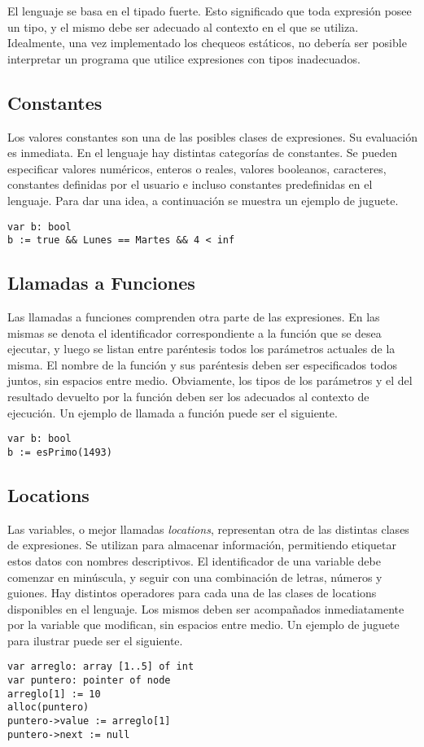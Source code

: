 \documentclass{article}
\begin{document}
El lenguaje se basa en el tipado fuerte.
Esto significado que toda expresión posee un tipo, y el mismo debe ser adecuado al contexto en el que se utiliza.
Idealmente, una vez implementado los chequeos estáticos, no debería ser posible interpretar un programa que utilice expresiones con tipos inadecuados.

\subsection{Constantes}

Los valores constantes son una de las posibles clases de expresiones.
Su evaluación es inmediata.
En el lenguaje hay distintas categorías de constantes.
Se pueden especificar valores numéricos, enteros o reales, valores booleanos, caracteres, constantes definidas por el usuario e incluso constantes predefinidas en el lenguaje.
Para dar una idea, a continuación se muestra un ejemplo de juguete.
\begin{lstlisting}
var b: bool
b := true && Lunes == Martes && 4 < inf
\end{lstlisting}

\subsection{Llamadas a Funciones}

Las llamadas a funciones comprenden otra parte de las expresiones.
En las mismas se denota el identificador correspondiente a la función que se desea ejecutar, y luego se listan entre paréntesis todos los parámetros actuales de la misma.
El nombre de la función y sus paréntesis deben ser especificados todos juntos, sin espacios entre medio.
Obviamente, los tipos de los parámetros y el del resultado devuelto por la función deben ser los adecuados al contexto de ejecución.
Un ejemplo de llamada a función puede ser el siguiente.
\begin{lstlisting}
var b: bool
b := esPrimo(1493)
\end{lstlisting}

\subsection{Locations}

Las variables, o mejor llamadas \textit{locations}, representan otra de las distintas clases de expresiones.
Se utilizan para almacenar información, permitiendo etiquetar estos datos con nombres descriptivos.
El identificador de una variable debe comenzar en minúscula, y seguir con una combinación de letras, números y guiones.
Hay distintos operadores para cada una de las clases de locations disponibles en el lenguaje.
Los mismos deben ser acompañados inmediatamente por la variable que modifican, sin espacios entre medio.
Un ejemplo de juguete para ilustrar puede ser el siguiente.
\begin{lstlisting}
var arreglo: array [1..5] of int
var puntero: pointer of node
arreglo[1] := 10
alloc(puntero)
puntero->value := arreglo[1]
puntero->next := null
\end{lstlisting}
\end{document}
